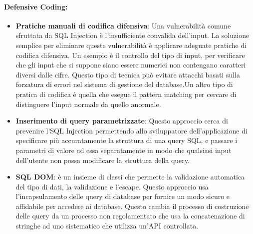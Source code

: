 \paragraph{Defensive Coding:}
\begin{itemize}
      \item \textbf{Pratiche manuali di codifica difensiva}: Una vulnerabilità
            comune sfruttata da SQL Injection è l'insufficiente convalida
            dell'input. La soluzione semplice per eliminare queste vulnerabilità
            è applicare adeguate pratiche di codifica difensiva. Un esempio è il
            controllo del tipo di input, per verificare che gli input che si
            suppone siano essere numerici non contengano caratteri diversi dalle
            cifre. Questo tipo di tecnica può evitare attacchi basati sulla
            forzatura di errori nel sistema di gestione del database.Un altro
            tipo di pratica di codifica è quella che esegue il pattern matching
            per cercare di distinguere l'input normale da quello anormale.
      \item \textbf{Inserimento di query parametrizzate}: Questo approccio cerca
            di prevenire l'SQL Injection permettendo allo sviluppatore
            dell'applicazione di specificare più accuratamente la struttura di
            una query SQL, e passare i parametri di valore ad essa separatamente
            in modo che qualsiasi input dell'utente non possa
            modificare la struttura della query.
      \item \textbf{SQL DOM}: è un insieme di classi che permette la
            validazione automatica del tipo di dati, la validazione e l'escape.
            Questo approccio usa l'incapsulamento delle query di database per
            fornire un modo sicuro e affidabile per accedere ai database. Questo
            cambia il processo di costruzione delle query da un processo non
            regolamentato che usa la concatenazione di stringhe ad uno
            sistematico che utilizza un'API controllata.
\end{itemize}

